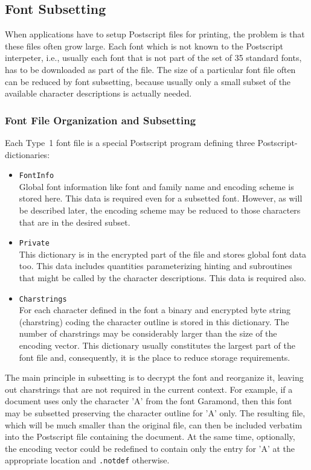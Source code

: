 \subsection{Font Subsetting}
\label{Font Subsetting}%
When applications have to setup Postscript files for printing, the problem is
that these files often grow large. Each font which is not known to the
Postscript interpeter, i.e., usually each font that is not part of the set of
35 standard fonts, has to be downloaded as part of the file. The size of a
particular font file often can be reduced by font subsetting, because usually
only a small subset of the available character descriptions is actually
needed. 



\subsubsection{Font File Organization and Subsetting}
\label{Font File Organization and Subsetting}%

Each Type~1 font file is a special Postscript program defining three
Postscript-dictionaries:
\begin{itemize}
\item \verb+FontInfo+\\
  Global font information like font and family name and encoding scheme is
  stored here. This data is required even for a subsetted font. However, as
  will be described later, the encoding scheme may be reduced to those
  characters that are in the desired subset. 
\item \verb+Private+\\
  This dictionary is in the encrypted part of the file and stores global font
  data too. This data includes quantities parameterizing hinting and
  subroutines that might be called by the character descriptions. This data is
  required also.
\item \verb+Charstrings+\\
  For each character defined in the font a binary and encrypted byte string
  (charstring) coding the character outline is stored in this dictionary. The
  number of charstrings may be considerably larger than the size of the
  encoding vector. This dictionary usually constitutes the largest part of the
  font file and, consequently, it is the place to reduce storage requirements.
\end{itemize}
The main principle in subsetting is to decrypt the font and reorganize it,
leaving out charstrings that are not required in the current context. For
example, if a document uses only the character 'A' from the font Garamond,
then this font may be subsetted preserving the character outline for 'A'
only. The resulting file, which will be much smaller than the original file,
can then be included verbatim into the Postscript file containing the
document. At the same time, optionally, the encoding vector could be redefined
to contain only the entry for 'A' at the appropriate location and
\verb+.notdef+ otherwise. 

